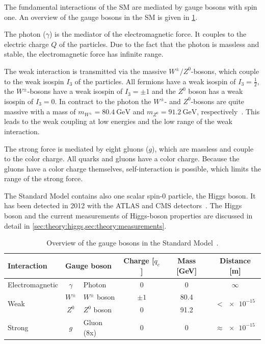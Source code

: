 The fundamental interactions of the SM are mediated by gauge bosons with spin one.
An overview of the gauge bosons in the SM is given in \cref{tab:theory:bosons}.

The photon ($\gamma$) is the mediator of the electromagnetic force.
It couples to the electric charge $Q$ of the particles.
Due to the fact that the photon is massless and stable, the electromagnetic force has infinite range.

The weak interaction is transmitted via the massive $W^\pm/Z^0$-bosons, which couple to the weak isospin $I_3$ of the particles.
All fermions have a weak isospin of $I_3 = \frac{1}{2}$, the $W^\pm$-bosons have a weak isospin of $I_3 = \pm 1$ and the $Z^0$ boson
has a weak isospin of $I_3 = 0$. %
In contract to the photon the $W^\pm$- and $Z^0$-bosons are quite massive with a mass of $m_{W^\pm} = \SI{80.4}{\GeV}$ and
$m_{Z^0} = \SI{91.2}{\GeV}$, respectively~\cite{PDG}.
This leads to the weak coupling at low energies and the low range of the weak interaction.

The strong force is mediated by eight gluons ($g$), which are massless and couple to the color charge.
All quarks and gluons have a color charge.
Because the gluons have a color charge themselves, self-interaction is possible, which limits the range of the
strong force.

The Standard Model contains also one scalar spin-0 particle, the Higgs boson.
It has been detected in 2012 with the ATLAS and CMS detectors~\cite{HiggsDiscoveryATLAS,HiggsDiscoveryCMS}.
The Higgs boson and the current measurements of Higgs-boson properties are discussed in detail in \cref{sec:theory:higgs,sec:theory:measurements}.

\begin{table}[htpb]
    \centering
    \caption{Overview of the gauge bosons in the Standard Model~\cite{PDG}.}\label{tab:theory:bosons}
    \begin{tabular}{lclccc}
        \toprule
        Interaction             & \multicolumn{2}{l}{Gauge boson}   & Charge [$q_e$]    & Mass [GeV] & Distance [m] \\  \midrule
        Electromagnetic         & $\gamma$  & Photon                & $0$               & 0          & $\infty$                         \\ \cmidrule{1-6}
        \multirow{2}{*}{Weak}   & $W^\pm$   & $W^\pm$ boson         & $\pm 1$           & 80.4       & \multirow{2}{*}{$< \num{e-15}$}  \\
                                & $Z^0$     & $Z^0$ boson           & $0$               & 91.2       &                                  \\ \cmidrule{1-6}
        Strong                  & $g$       & Gluon (8x)            & $0$               & 0          & $\approx \num{e-15}$             \\
        \bottomrule
    \end{tabular}
\end{table}


